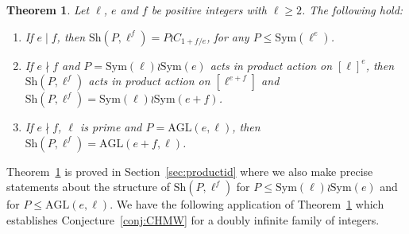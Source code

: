 \documentclass[12pt]{amsart}
\newtheorem{thm}{Theorem}[section]
\theoremstyle{remark}
\theoremstyle{definition}
\newcommand{\sym}{\mathrm{Sym}}
\newcommand{\alt}{\mathrm{Alt}}
\newcommand{\sh}{\mathrm{Sh}}
\newcommand{\GL}{\mathrm{GL}}
\newcommand{\AGL}{\mathrm{AGL}}
\begin{document}
\begin{thm} \label{thm:productid}
Let $\ell$, $e$ and $f$ be positive integers with  $\ell \geqslant 2$. The following hold:
	\begin{enumerate}
	\item If $e \mid f$, then $\sh(P,\ell^f) = P \wr C_{1+f/e}$, for any $P \leqslant \sym(\ell^e)$.
	\item \label{pa} If $e\nmid f$ and  $P = \sym(\ell) \wr \sym(e)$ acts in product action on $[\ell]^{e}$, then $\sh(P, \ell^f)$ acts in product action on $[\ell^{e+f}]$ and $ \sh(P, \ell^f) =\sym(\ell) \wr \sym(e+f)$.
	\item If $e\nmid f$, $\ell$ is prime and  $P=\AGL(e,\ell)$, then $\sh( P, \ell^f) =  \AGL(e+f,\ell)$.
	\end{enumerate}
\end{thm}


Theorem~\ref{thm:productid} is proved in Section~\ref{sec:productid} where we also make precise statements about  the  structure of $\sh(P, \ell^f)$ for $P\leqslant \sym(\ell) \wr \sym(e)$ and for $P \leqslant \AGL(e,\ell)$. We have the following application of Theorem~\ref{thm:productid} which establishes Conjecture~\ref{conj:CHMW} for a doubly infinite family of integers.
\end{document}
